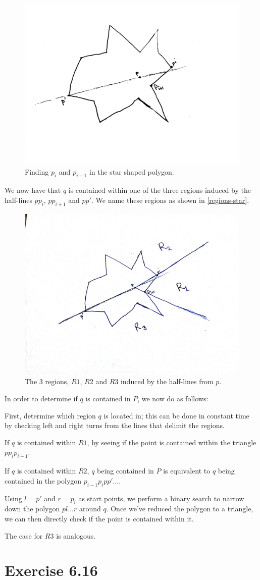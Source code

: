 \documentclass[11pt,a4paper]{article}
\begin{document}
\begin{figure}[h!]
    \centering
    \includegraphics[width=.7\textwidth]{regionsstar1.jpg}
    \caption{Finding $p_i$ and $p_{i+1}$ in the star shaped polygon.}
\end{figure}

We now have that $q$ is contained within one of the three regions induced
by the half-lines $p p_i$, $p p_{i+1}$ and $p p'$. We name these regions
as shown in \autoref{regions-star}.

\begin{figure}[h!]
    \centering
    \includegraphics[width=.7\textwidth]{regionsstar2.jpg}
    \caption{The 3 regions, $R1$, $R2$ and $R3$ induced by the half-lines
    from $p$.}
    \label{regions-star}
\end{figure}

In order to determine if $q$ is contained in $P$, we now do as follows:

First, determine which region $q$ is located in; this can be done in constant
time by checking left and right turns from the lines that delimit the
regions.

If $q$ is contained within $R1$, by seeing if the point is
contained within the triangle $p p_i p_{i+1}$.

If $q$ is contained within $R2$, $q$ being contained in $P$ is equivalent to
$q$ being contained in the polygon $p_{i-1} p_i p p' \ldots$.

Using $l = p'$ and $r = p_i$ as start points, we perform a binary search to
narrow down the polygon $p l \ldots r$ around $q$. Once we've reduced the
polygon to a triangle, we can then directly check if the point is contained
within it.

The case for $R3$ is analogous.

\section{Exercise 6.16}
\end{document}
